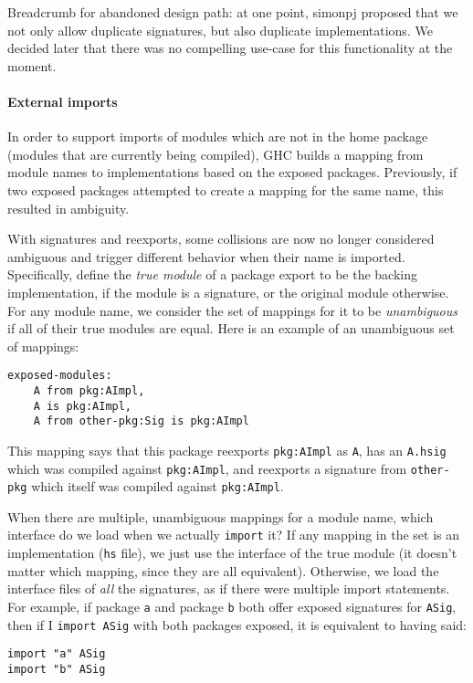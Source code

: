 \documentclass{article}
\newcommand{\Red}[1]{{\color{red} #1}}
\begin{document}
\Red{Breadcrumb for abandoned design path: at one point, simonpj proposed
that we not only allow duplicate signatures, but also duplicate implementations.
We decided later that there was no compelling use-case for this functionality
at the moment.}

\paragraph{External imports}
In order to support imports of modules which are not in the home package
(modules that are currently being compiled), GHC builds a mapping from module
names to implementations based on the exposed packages. Previously, if
two exposed packages attempted to create a mapping for the same name,
this resulted in ambiguity.

With signatures and reexports, some collisions are now no longer
considered ambiguous and trigger different behavior when their name is
imported.  Specifically, define the \emph{true module} of a package export
to be the backing implementation, if the module is a signature, or the
original module otherwise.  For any module name, we consider the set of
mappings for it to be \emph{unambiguous} if all of their true modules
are equal.  Here is an example of an unambiguous set of mappings:

\begin{verbatim}
exposed-modules:
    A from pkg:AImpl,
    A is pkg:AImpl,
    A from other-pkg:Sig is pkg:AImpl
\end{verbatim}

This mapping says that this package reexports \texttt{pkg:AImpl} as
\texttt{A}, has an \texttt{A.hsig} which was compiled against
\texttt{pkg:AImpl}, and reexports a signature from \texttt{other-pkg}
which itself was compiled against \texttt{pkg:AImpl}.

When there are multiple, unambiguous mappings for a module name, which
interface do we load when we actually \texttt{import} it?  If any
mapping in the set is an implementation (\texttt{hs} file), we just use
the interface of the true module (it doesn't matter which mapping, since
they are all equivalent).  Otherwise, we load the interface files of
\emph{all} the signatures, as if there were multiple import statements.
For example, if package \texttt{a} and package \texttt{b} both offer
exposed signatures for \texttt{ASig}, then if I \texttt{import ASig}
with both packages exposed, it is equivalent to having said:

\begin{verbatim}
import "a" ASig
import "b" ASig
\end{verbatim}
\end{document}
